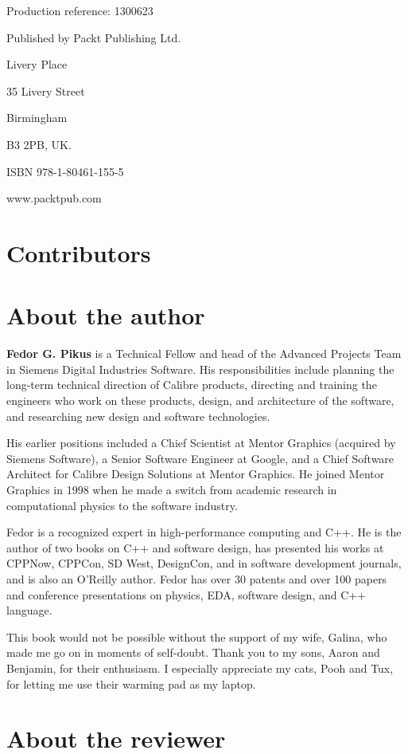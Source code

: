 Production reference: 1300623

Published by Packt Publishing Ltd.

Livery Place

35 Livery Street

Birmingham

B3 2PB, UK.

ISBN 978-1-80461-155-5

www.packtpub.com

\section{Contributors}

\section{About the author}

\textbf{Fedor G. Pikus} is a Technical Fellow and head of the Advanced Projects Team in Siemens Digital Industries Software. His responsibilities include planning the long-term technical direction of Calibre products, directing and training the engineers who work on these products, design, and architecture of the software, and researching new design and software technologies.

His earlier positions included a Chief Scientist at Mentor Graphics (acquired by Siemens Software), a Senior Software Engineer at Google, and a Chief Software Architect for Calibre Design Solutions at Mentor Graphics. He joined Mentor Graphics in 1998 when he made a switch from academic research in computational physics to the software industry.

Fedor is a recognized expert in high-performance computing and C++. He is the author of two books on C++ and software design, has presented his works at CPPNow, CPPCon, SD West, DesignCon, and in software development journals, and is also an O'Reilly author. Fedor has over 30 patents and over 100 papers and conference presentations on physics, EDA, software design, and C++ language.

This book would not be possible without the support of my wife, Galina, who made me go on in moments of self-doubt. Thank you to my sons, Aaron and Benjamin, for their enthusiasm. I especially appreciate my cats, Pooh and Tux, for letting me use their warming pad as my laptop.

\section{About the reviewer}

